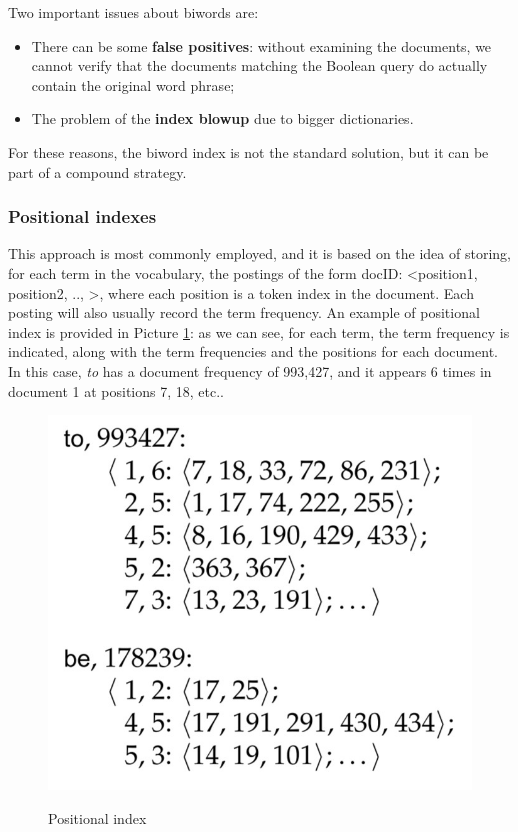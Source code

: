 Two important issues about biwords are:

\begin{itemize}
    \item There can be some \textbf{false positives}: without examining the documents, we cannot verify that the documents matching the Boolean query do actually contain the original word phrase;
    \item The problem of the \textbf{index blowup} due to bigger dictionaries.
\end{itemize}

For these reasons, the biword index is not the standard solution, but it can be part of a compound strategy.

\subsubsection{Positional indexes}
This approach is most commonly employed, and it is based on the idea of storing, for each term in the vocabulary, the postings of the form docID: <position1, position2, .., >, where each position is a token index in the document. Each posting will also usually record the term frequency. An example of positional index is provided in Picture \ref{pos_index}: as we can see, for each term, the term frequency is indicated, along with the term frequencies and the positions for each document. In this case, \textit{to} has a document frequency of 993,427, and it appears 6 times in document 1 at positions 7, 18, etc..

\begin{figure}[h!]
		\centering
		\includegraphics[scale = 0.8]{img/positional_index.jpg}
		\label{pos_index}
        \caption{Positional index}
\end{figure}

